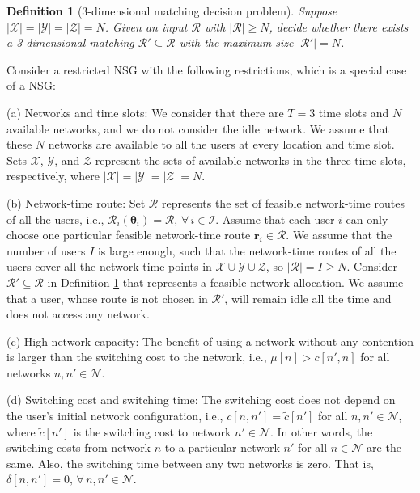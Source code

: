 \documentclass[journal]{IEEEtran}
\newcommand{\mc}[1]{\mathcal{#1}}
\newcommand{\bs}[1]{\boldsymbol{#1}}
\newcommand{\fa}[2]{\, \forall \, #1 \in \mathcal{#2}}
\newtheorem{definition}{Definition}
\begin{document}
\begin{definition}[3-dimensional matching decision problem] \label{def:3dmatchproblem}
	Suppose $|\mathcal{X}| = |\mathcal{Y}| = |\mathcal{Z}| = N$. Given an input $\mathcal{R}$ with $|\mathcal{R}| \geq N$, decide whether there exists a 3-dimensional matching $\mathcal{R}' \subseteq \mathcal{R}$ with the maximum size $|\mathcal{R}'| = N$.
\end{definition}

  Consider a restricted NSG with the following restrictions, which is a special case of a NSG:	
	
(a) Networks and time slots: We consider that there are $T = 3$ time slots and $N$ available networks, and we do not consider the idle network. We assume that these $N$ networks are available to all the users at every location and time slot. Sets $\mathcal{X}$, $\mathcal{Y}$, and $\mathcal{Z}$ represent the sets of available networks in the three time slots, respectively, where $|\mathcal{X}| = |\mathcal{Y}| = |\mathcal{Z}| = N$.

(b) Network-time route: Set $\mathcal{R}$ represents the set of feasible network-time routes of all the users, i.e., $\mathcal{R}_i(\bs{\theta}_i) = \mathcal{R}, \, \forall \, i \in \mathcal{I}$. 
	Assume that each user $i$ can only choose one particular feasible network-time route $\bs{r}_i \in \mathcal{R}$.
  We assume that the number of users $I$ is large enough, such that the network-time routes of all the users cover all the network-time points in $\mathcal{X} \cup \mathcal{Y} \cup \mathcal{Z}$, so $|\mathcal{R}| = I \geq N$.
	Consider $\mathcal{R}' \subseteq \mathcal{R}$ in Definition \ref{def:3dmatchproblem} that represents a feasible network allocation. 
	We assume that a user, whose route is not chosen in $\mathcal{R}'$, will remain idle all the time and does not access any network.
		
(c) High network capacity: The benefit of using a network without any contention is larger than the switching cost to the network, i.e., $\mu[n] > c[n',n]$ for all networks $n,n' \in \mathcal{N}$. 

(d) Switching cost and switching time: The switching cost does not depend on the user's initial network configuration, i.e., $c[n,n'] = \tilde{c}[n']$ for all $n,n' \in \mathcal{N}$, where $\tilde{c}[n']$ is the switching cost to network $n' \in \mathcal{N}$. 
  In other words, the switching costs from network $n$ to a particular network $n'$ for all $n \in \mc{N}$ are the same.
	Also, the switching time between any two networks is zero. That is, $\delta[n,n'] = 0, \fa{n,n'}{N}$.
\end{document}
